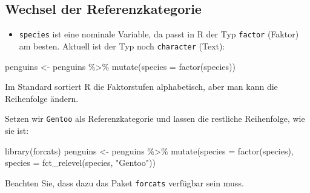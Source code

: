 \documentclass[
  a4paper,
  DIV=11]{scrreprt}
\newenvironment{Shaded}{\begin{snugshade}}{\end{snugshade}}
\newcommand{\AttributeTok}[1]{\textcolor[rgb]{0.40,0.45,0.13}{#1}}
\newcommand{\DocumentationTok}[1]{\textcolor[rgb]{0.37,0.37,0.37}{\textit{#1}}}
\newcommand{\FunctionTok}[1]{\textcolor[rgb]{0.28,0.35,0.67}{#1}}
\newcommand{\NormalTok}[1]{\textcolor[rgb]{0.00,0.23,0.31}{#1}}
\newcommand{\OtherTok}[1]{\textcolor[rgb]{0.00,0.23,0.31}{#1}}
\newcommand{\SpecialCharTok}[1]{\textcolor[rgb]{0.37,0.37,0.37}{#1}}
\newcommand{\StringTok}[1]{\textcolor[rgb]{0.13,0.47,0.30}{#1}}
\providecommand{\tightlist}{%
  \setlength{\itemsep}{0pt}\setlength{\parskip}{0pt}}\usepackage{longtable,booktabs,array}
\theoremstyle{definition}
\theoremstyle{remark}
\begin{document}
\hypertarget{wechsel-der-referenzkategorie}{%
\subsection{Wechsel der
Referenzkategorie}\label{wechsel-der-referenzkategorie}}

\begin{itemize}
\tightlist
\item
  \texttt{species} ist eine nominale Variable, da passt in R der Typ
  \texttt{factor} (Faktor) am besten. Aktuell ist der Typ noch
  \texttt{character} (Text):
\end{itemize}

\begin{Shaded}
\begin{Highlighting}[]
\NormalTok{penguins }\OtherTok{\textless{}{-}}\NormalTok{ penguins }\SpecialCharTok{\%\textgreater{}\%} 
  \FunctionTok{mutate}\NormalTok{(}\AttributeTok{species =} \FunctionTok{factor}\NormalTok{(species))}
\end{Highlighting}
\end{Shaded}

Im Standard sortiert R die Faktorstufen alphabetisch, aber man kann die
Reihenfolge ändern.

\begin{Shaded}
\end{Shaded}

Setzen wir \texttt{Gentoo} als Referenzkategorie und lassen die
restliche Reihenfolge, wie sie ist:

\begin{Shaded}
\begin{Highlighting}[]
\FunctionTok{library}\NormalTok{(forcats)}
\NormalTok{penguins }\OtherTok{\textless{}{-}}\NormalTok{ penguins }\SpecialCharTok{\%\textgreater{}\%} 
  \FunctionTok{mutate}\NormalTok{(}\AttributeTok{species =} \FunctionTok{factor}\NormalTok{(species),}
    \AttributeTok{species =} \FunctionTok{fct\_relevel}\NormalTok{(species, }\StringTok{"Gentoo"}\NormalTok{))}
\end{Highlighting}
\end{Shaded}

Beachten Sie, dass dazu das Paket \texttt{forcats} verfügbar sein muss.
\end{document}
